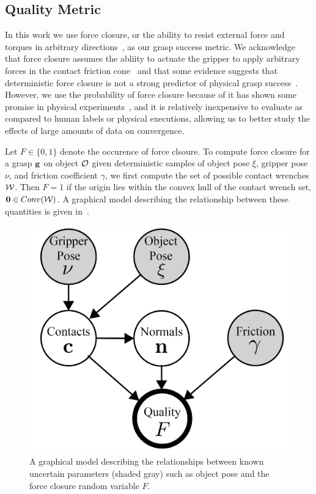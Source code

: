 \subsection{Quality Metric}
In this work we use force closure, or the ability to resist external force and torques in arbitrary directions~\cite{ferrari1992}, as our grasp success metric.
We acknowledge that force closure assumes the abliity to actuate the gripper to apply arbitrary forces in the contact friction cone~\cite{} and that some evidence suggests that deterministic force closure is not a strong predictor of physical grasp success~\cite{balasubramanian2012physical}.
However, we use the probability of force closure because of it has shown some promise in physical experiments~\cite{kim2012physically, weisz2012pose}, and it is relatively inexpensive to evaluate as compared to human labels or physical executions, allowing us to better study the effects of large amounts of data on convergence.

Let $F \in \{0, 1\}$ denote the occurence of force clsoure.
To compute force closure for a grasp $\mathbf{g}$ on object $\mathcal{O}$ given deterministic samples of object pose $\xi$, gripper pose $\nu$, and friction coefficient $\gamma$, we first compute the set of possible contact wrenches $\mathcal{W}$.
Then $F = 1$ if the origin lies within the convex hull of the contact wrench set, $\mathbf{0} \in Conv(\mathcal{W})$.
A graphical model describing the relationship between these quantities is given in~.

\begin{figure}[t!]
\centering
\includegraphics[scale=0.5]{figures/illustrations/dexnet_graphical_model_simple.png}
\caption{A graphical model describing the relationships between known uncertain parameters (shaded gray) such as object pose and the force closure random variable $F$.}
\vspace*{-15pt}
\end{figure}

